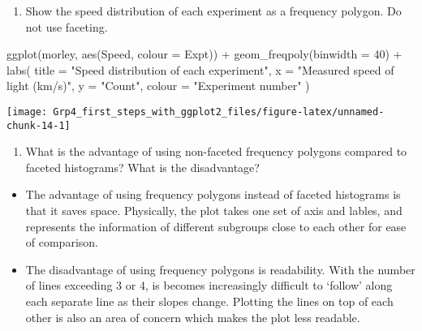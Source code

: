 \documentclass[
]{article}
\newenvironment{Shaded}{\begin{snugshade}}{\end{snugshade}}
\newcommand{\AttributeTok}[1]{\textcolor[rgb]{0.77,0.63,0.00}{#1}}
\newcommand{\DecValTok}[1]{\textcolor[rgb]{0.00,0.00,0.81}{#1}}
\newcommand{\FunctionTok}[1]{\textcolor[rgb]{0.00,0.00,0.00}{#1}}
\newcommand{\NormalTok}[1]{#1}
\newcommand{\SpecialCharTok}[1]{\textcolor[rgb]{0.00,0.00,0.00}{#1}}
\newcommand{\StringTok}[1]{\textcolor[rgb]{0.31,0.60,0.02}{#1}}
\providecommand{\tightlist}{%
  \setlength{\itemsep}{0pt}\setlength{\parskip}{0pt}}
\begin{document}
\begin{enumerate}
\def\labelenumi{(\roman{enumi})}
\tightlist
\item
  Show the speed distribution of each experiment as a frequency polygon.
  Do not use faceting.
\end{enumerate}

\begin{Shaded}
\begin{Highlighting}[]
  \FunctionTok{ggplot}\NormalTok{(morley, }\FunctionTok{aes}\NormalTok{(Speed, }\AttributeTok{colour =}\NormalTok{ Expt)) }\SpecialCharTok{+} 
  \FunctionTok{geom\_freqpoly}\NormalTok{(}\AttributeTok{binwidth =} \DecValTok{40}\NormalTok{) }\SpecialCharTok{+} 
  \FunctionTok{labs}\NormalTok{(}
    \AttributeTok{title =} \StringTok{"Speed distribution of each experiment"}\NormalTok{,}
    \AttributeTok{x =} \StringTok{"Measured speed of light (km/s)"}\NormalTok{,}
    \AttributeTok{y =} \StringTok{"Count"}\NormalTok{,}
    \AttributeTok{colour =} \StringTok{"Experiment number"}
\NormalTok{  )}
\end{Highlighting}
\end{Shaded}

\begin{center}\texttt{[image: Grp4\_first\_steps\_with\_ggplot2\_files/figure-latex/unnamed-chunk-14-1]} \end{center}

\begin{enumerate}
\def\labelenumi{(\alph{enumi})}
\setcounter{enumi}{9}
\tightlist
\item
  What is the advantage of using non-faceted frequency polygons compared
  to faceted histograms? What is the disadvantage?
\end{enumerate}

\begin{itemize}
\item
  The advantage of using frequency polygons instead of faceted
  histograms is that it saves space. Physically, the plot takes one set
  of axis and lables, and represents the information of different
  subgroups close to each other for ease of comparison.
\item
  The disadvantage of using frequency polygons is readability. With the
  number of lines exceeding 3 or 4, is becomes increasingly difficult to
  `follow' along each separate line as their slopes change. Plotting the
  lines on top of each other is also an area of concern which makes the
  plot less readable.
\end{itemize}
\end{document}
